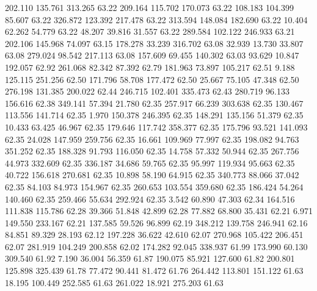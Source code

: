  202.110  135.761  313.265        63.22
 209.164  115.702  170.073        63.22
 108.183  104.399   85.607        63.22
 326.872  123.392  217.478        63.22
 313.594  148.084  182.690        63.22
  10.404   62.262   54.779        63.22
  48.207   39.816   31.557        63.22
 289.584  102.122  246.933        63.21
 202.106  145.968   74.097        63.15
 178.278   33.239  316.702        63.08
  32.939   13.730   33.807        63.08
 279.024   98.542  217.113        63.08
 157.609   69.455  140.302        63.03
  93.629   10.847  192.057        62.92
 261.068   82.342   87.392        62.79
 181.963   73.897  105.217        62.51
   9.188  125.115  251.256        62.50
 171.796   58.708  177.472        62.50
  25.667   75.105   47.348        62.50
 276.198  131.385  200.022        62.44
 246.715  102.401  335.473        62.43
 280.719   96.133  156.616        62.38
 349.141   57.394   21.780        62.35
 257.917   66.239  303.638        62.35
 130.467  113.556  141.714        62.35
   1.970  150.378  246.395        62.35
 148.291  135.156   51.379        62.35
  10.433   63.425   46.967        62.35
 179.646  117.742  358.377        62.35
 175.796   93.521  141.093        62.35
  24.028  147.959  259.756        62.35
  16.661  109.969   77.997        62.35
 198.082   94.763  351.252        62.35
 188.328   91.793  116.050        62.35
  14.758   57.332   50.944        62.35
 267.756   44.973  332.609        62.35
 336.187   34.686   59.765        62.35
  95.997  119.934   95.663        62.35
  40.722  156.618  270.681        62.35
  10.898   58.190   64.915        62.35
 340.773   88.066   37.042        62.35
  84.103   84.973  154.967        62.35
 260.653  103.554  359.680        62.35
 186.424   54.264  140.460        62.35
 259.466   55.634  292.924        62.35
   3.542   60.890   47.303        62.34
 164.516  111.838  115.786        62.28
  39.366   51.848   42.899        62.28
  77.882   68.800   35.431        62.21
   6.971  149.550  233.167        62.21
 137.585   59.526   96.899        62.19
 348.212  139.758  246.941        62.16
  84.851   89.329   28.193        62.12
 197.228   36.622   42.610        62.07
 270.968  105.422  206.451        62.07
 281.919  104.249  200.858        62.02
 174.282   92.045  338.937        61.99
 173.990   60.130  309.540        61.92
   7.190   36.004   56.359        61.87
 190.075   85.921  127.600        61.82
 200.801  125.898  325.439        61.78
  77.472   90.441   81.472        61.76
 264.442  113.801  151.122        61.63
  18.195  100.449  252.585        61.63
 261.022   18.921  275.203        61.63
